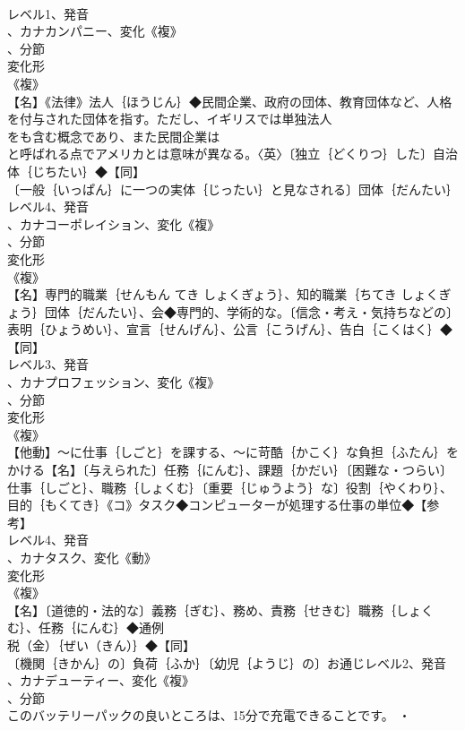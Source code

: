 \documentclass[8pt]{extreport}
\begin{document}
\begin{CJK}{UTF8}{min}
\\	レベル1、発音
\\	、カナカンパニー、変化《複》
\\	、分節
\\	変化形 
\\	《複》
\\	【名】《法律》法人｛ほうじん｝◆民間企業、政府の団体、教育団体など、人格を付与された団体を指す。ただし、イギリスでは単独法人
\\	をも含む概念であり、また民間企業は
\\	と呼ばれる点でアメリカとは意味が異なる。〈英〉〔独立｛どくりつ｝した〕自治体｛じちたい｝◆【同】
\\	〔一般｛いっぱん｝に一つの実体｛じったい｝と見なされる〕団体｛だんたい｝レベル4、発音
\\	、カナコーポレイション、変化《複》
\\	、分節
\\	変化形 
\\	《複》
\\	【名】専門的職業｛せんもん てき しょくぎょう｝、知的職業｛ちてき しょくぎょう｝団体｛だんたい｝、会◆専門的、学術的な。〔信念・考え・気持ちなどの〕表明｛ひょうめい｝、宣言｛せんげん｝、公言｛こうげん｝、告白｛こくはく｝◆【同】
\\	レベル3、発音
\\	、カナプロフェッション、変化《複》
\\	、分節
\\	変化形 
\\	《複》
\\	【他動】～に仕事｛しごと｝を課する、～に苛酷｛かこく｝な負担｛ふたん｝をかける【名】〔与えられた〕任務｛にんむ｝、課題｛かだい｝〔困難な・つらい〕仕事｛しごと｝、職務｛しょくむ｝〔重要｛じゅうよう｝な〕役割｛やくわり｝、目的｛もくてき｝《コ》タスク◆コンピューターが処理する仕事の単位◆【参考】
\\	レベル4、発音
\\	、カナタスク、変化《動》
\\	変化形 
\\	《複》
\\	【名】〔道徳的・法的な〕義務｛ぎむ｝、務め、責務｛せきむ｝職務｛しょくむ｝、任務｛にんむ｝◆通例
\\	税（金）｛ぜい（きん）｝◆【同】
\\	〔機関｛きかん｝の〕負荷｛ふか｝〔幼児｛ようじ｝の〕お通じレベル2、発音
\\	、カナデューティー、変化《複》
\\	、分節
\\	このバッテリーパックの良いところは、15分で充電できることです。 ・

\end{CJK}
\end{document}

